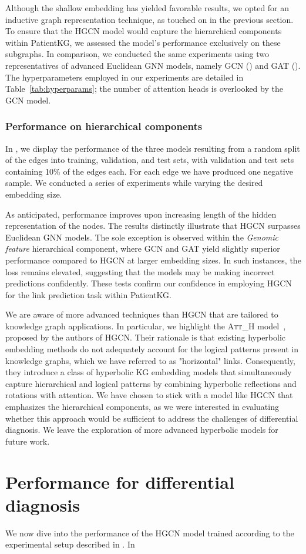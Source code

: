 Although the shallow embedding has yielded favorable results, we opted for an inductive graph representation technique, as touched on in the previous section. To ensure that the HGCN model would capture the hierarchical components within PatientKG, we assessed the model's performance exclusively on these subgraphs. In comparison, we conducted the same experiments using two representatives of advanced Euclidean GNN models, namely GCN () and GAT (). The hyperparameters employed in our experiments are detailed in Table~\ref{tab:hyperparams}; the number of attention heads is overlooked by the GCN model. 

\subsubsection{Performance on hierarchical components}

In , we display the performance of the three models resulting from a random split of the edges into training, validation, and test sets, with validation and test sets containing 10\% of the edges each. For each edge we have produced one negative sample. We conducted a series of experiments while varying the desired embedding size. 

As anticipated, performance improves upon increasing length of the hidden representation of the nodes. The results distinctly illustrate that HGCN surpasses Euclidean GNN models. The sole exception is observed within the \emph{Genomic feature} hierarchical component, where GCN and GAT yield slightly superior performance compared to HGCN at larger embedding sizes. In such instances, the loss remains elevated, suggesting that the models may be making incorrect predictions confidently. These tests confirm our confidence in employing HGCN for the link prediction task within PatientKG.


We are aware of more advanced techniques than HGCN that are tailored to knowledge graph applications. In particular, we highlight the \textsc{Att\_H} model~\cite{chami2020lowDimensionalHyperbolicKnowledgeGraphEmbeddings}, proposed by the authors of HGCN. Their rationale is that existing hyperbolic embedding methods do not adequately account for the logical patterns present in knowledge graphs, which we have referred to as "horizontal" links. Consequently, they introduce a class of hyperbolic KG embedding models that simultaneously capture hierarchical and logical patterns by combining hyperbolic reflections and rotations with attention. We have chosen to stick with a model like HGCN that emphasizes the hierarchical components, as we were interested in evaluating whether this approach would be sufficient to address the challenges of differential diagnosis. We leave the exploration of more advanced hyperbolic models for future work.






\section{Performance for differential diagnosis}
We now dive into the performance of the HGCN model trained according to the experimental setup described in . In 


